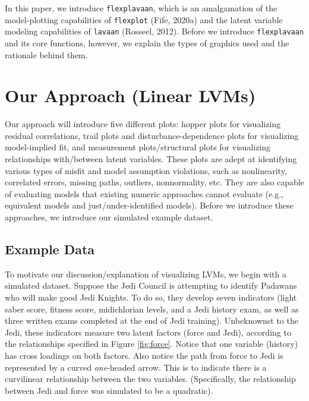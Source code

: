 \documentclass[
  english,
  man]{apa6}
\begin{document}
In this paper, we introduce \texttt{flexplavaan}, which is an amalgamation of the model-plotting capabilities of \texttt{flexplot} (Fife, 2020a) and the latent variable modeling capabilities of \texttt{lavaan} (Rosseel, 2012). Before we introduce \texttt{flexplavaan} and its core functions, however, we explain the types of graphics used and the rationale behind them.

\hypertarget{our-approach-linear-lvms}{%
\section{Our Approach (Linear LVMs)}\label{our-approach-linear-lvms}}

Our approach will introduce five different plots: hopper plots for visualizing residual correlations, trail plots and disturbance-dependence plots for visualizing model-implied fit, and measurement plots/structural plots for visualizing relationships with/between latent variables. These plots are adept at identifying various types of misfit and model assumption violations, such as nonlinearity, correlated errors, missing paths, outliers, nonnormality, etc. They are also capable of evaluating models that existing numeric approaches cannot evaluate (e.g., equivalent models and just/under-identified models). Before we introduce these approaches, we introduce our simulated example dataset.

\hypertarget{example-data}{%
\subsection{Example Data}\label{example-data}}

To motivate our discussion/explanation of visualizing LVMs, we begin with a simulated dataset. Suppose the Jedi Council is attempting to identify Padawans who will make good Jedi Knights. To do so, they develop seven indicators (light saber score, fitness score, midichlorian levels, and a Jedi history exam, as well as three written exams completed at the end of Jedi training). Unbeknownst to the Jedi, these indicators measure two latent factors (force and Jedi), according to the relationships specified in Figure \ref{fig:force}. Notice that one variable (history) has cross loadings on both factors. Also notice the path from force to Jedi is represented by a curved \emph{one}-headed arrow. This is to indicate there is a curvilinear relationship between the two variables. (Specifically, the relationship between Jedi and force was simulated to be a quadratic).
\end{document}
